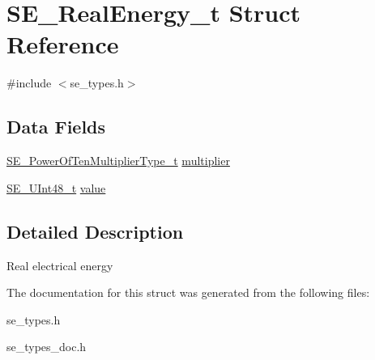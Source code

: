 \hypertarget{structSE__RealEnergy__t}{}\section{S\+E\+\_\+\+Real\+Energy\+\_\+t Struct Reference}
\label{structSE__RealEnergy__t}


{\ttfamily \#include $<$se\+\_\+types.\+h$>$}

\subsection*{Data Fields}
\begin{DoxyCompactItemize}
\item 
\hyperlink{group__PowerOfTenMultiplierType_gaf0317b781dc8dbb9cb6ac4e44a14fdef}{S\+E\+\_\+\+Power\+Of\+Ten\+Multiplier\+Type\+\_\+t} \hyperlink{group__RealEnergy_gab9ca1391c8d23c03e421ed0b974896f2}{multiplier}
\item 
\hyperlink{group__UInt48_gaa15d726fc29126d24b991437334d77a0}{S\+E\+\_\+\+U\+Int48\+\_\+t} \hyperlink{group__RealEnergy_ga9995a7c4d5cf5ad6283eea0d8b343426}{value}
\end{DoxyCompactItemize}


\subsection{Detailed Description}
Real electrical energy 

The documentation for this struct was generated from the following files\+:\begin{DoxyCompactItemize}
\item 
se\+\_\+types.\+h\item 
se\+\_\+types\+\_\+doc.\+h\end{DoxyCompactItemize}
